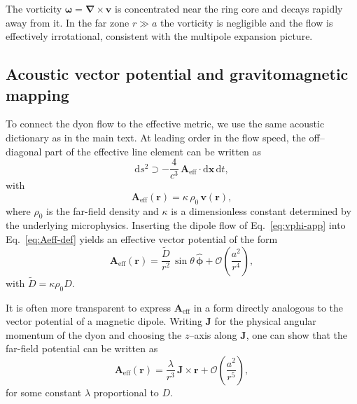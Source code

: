 \documentclass[11pt]{article}
\newcommand{\dd}{\mathrm{d}}
\begin{document}
The vorticity $\bm{\omega} = \bm{\nabla}\times\mathbf{v}$ is
concentrated near the ring core and decays rapidly away from it.
In the far zone $r\gg a$ the vorticity is negligible and the flow is
effectively irrotational, consistent with the multipole expansion
picture.

\subsection{Acoustic vector potential and gravitomagnetic mapping}

To connect the dyon flow to the effective metric, we use the same
acoustic dictionary as in the main text.
At leading order in the flow speed, the off--diagonal part of the
effective line element can be written as
\begin{equation}
  \dd s^2
  \supset -\frac{4}{c^3}\,\mathbf{A}_{\text{eff}}\cdot\dd\mathbf{x}\,\dd t,
\end{equation}
with
\begin{equation}
  \mathbf{A}_{\text{eff}}(\mathbf{r})
  = \kappa\,\rho_0\,\mathbf{v}(\mathbf{r}),
  \label{eq:Aeff-def}
\end{equation}
where $\rho_0$ is the far-field density and $\kappa$ is a
dimensionless constant determined by the underlying microphysics.
Inserting the dipole flow of Eq.~\eqref{eq:vphi-app} into
Eq.~\eqref{eq:Aeff-def} yields an effective vector potential of the
form
\begin{equation}
  \mathbf{A}_{\text{eff}}(\mathbf{r})
  = \frac{\tilde{D}}{r^2}\,\sin\theta\,\hat{\bm{\phi}}
  + \mathcal{O}\!\left(\frac{a^2}{r^4}\right),
\end{equation}
with $\tilde{D} = \kappa\rho_0 D$.

It is often more transparent to express $\mathbf{A}_{\text{eff}}$ in
a form directly analogous to the vector potential of a magnetic
dipole.
Writing $\mathbf{J}$ for the physical angular momentum of the dyon
and choosing the $z$–axis along $\mathbf{J}$, one can show that the
far-field potential can be written as
\begin{equation}
  \mathbf{A}_{\text{eff}}(\mathbf{r})
  = \frac{\lambda}{r^3}\,\mathbf{J}\times\mathbf{r}
  + \mathcal{O}\!\left(\frac{a^2}{r^5}\right),
  \label{eq:Aeff-J-cross-r}
\end{equation}
for some constant $\lambda$ proportional to $D$.
\end{document}
